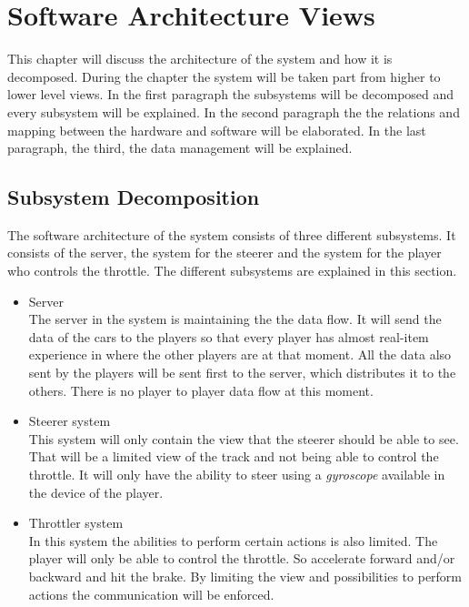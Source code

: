 \documentclass[11pt,twoside,a4paper]{article}
\begin{document}
\newpage

\section{Software Architecture Views}
This chapter will discuss the architecture of the system and how it is decomposed. During the chapter the system will be taken part from higher to lower level views. In the first paragraph the subsystems will be decomposed and every subsystem will be explained. In the second paragraph the the relations and mapping between the hardware and software will be elaborated. In the last paragraph, the third, the data management will be explained.

\subsection{Subsystem Decomposition}
The software architecture of the system consists of three different subsystems. It consists of the server, the system for the steerer and the system for the player who controls the throttle. The different subsystems are explained in this section.\\
\begin{itemize}
\item Server \hfill \\
    The server in the system is maintaining the the data flow. It will send the data of the cars to the players so that every player has almost real-item experience in where the other players are at that moment. All the data also sent by the players will be sent first to the server, which distributes it to the others. There is no player to player data flow at this moment. \\
    
\item Steerer system \hfill \\
    This system will only contain the view that the steerer should be able to see. That will be a limited view of the track and not being able to control the throttle. It will only have the ability to steer using a \emph{gyroscope} available in the device of the player. \\
    
\item Throttler system \hfill \\
    In this system the abilities to perform certain actions is also limited. The player will only be able to control the throttle. So accelerate forward and/or backward and hit the brake. By limiting the view and possibilities to perform actions the communication will be enforced. \\

\end{itemize}
\end{document}
